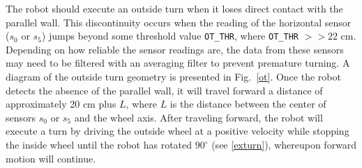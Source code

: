 \begin{figure}[h!]
\centering
\cprotect {}
\end{figure}
The robot should execute an outside turn when it loses direct contact
with the parallel wall. This discontinuity occurs when the reading of
the horizontal sensor (\(s_0\) or \(s_5\)) jumps beyond some threshold
value \verb+OT_THR+, where \verb+OT_THR+ \(>> 22\) cm. Depending on
how reliable the sensor readings are, the data from these sensors may
need to be filtered with an averaging filter to prevent
premature turning. A diagram of the outside turn geometry is presented
in Fig.~\ref{ot}. Once the robot detects the absence of the parallel
wall, it will travel forward a distance of approximately 20 cm plus
\(L\), where \(L\) is the distance between the center of sensors
\(s_0\) or \(s_5\) and the wheel axis. After traveling forward, the
robot will execute a turn by driving the outside wheel at a positive
velocity while stopping the inside wheel until the robot has rotated
\(90^\circ\) (see \ref{exturn}), whereupon forward motion will
continue.

